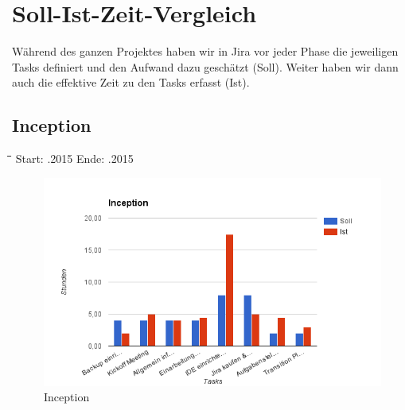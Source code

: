 \section{Soll-Ist-Zeit-Vergleich}
Während des ganzen Projektes haben wir in Jira vor jeder Phase die jeweiligen Tasks definiert und den Aufwand dazu geschätzt (Soll). Weiter haben wir dann auch die effektive Zeit zu den Tasks erfasst (Ist).
\subsection{Inception}
\begin{tabbing}[H]
    \hspace*{3cm}\=\hspace*{5cm}\=\hspace*{3cm}\=\hspace*{3cm}\= \kill
    Start: .2015 \>	Ende: .2015 \\
\end{tabbing}
\begin{figure}[H]
\centering
\includegraphics[width=390pt]{images/inception.png}
\caption[Inception]{Inception}
\end{figure}
\newpage
